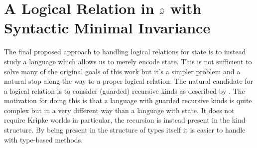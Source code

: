 \section{A Logical Relation in $\widehat{\omega}$ with Syntactic Minimal Invariance}\label{sec:guarded}

The final proposed approach to handling logical relations for state is
to instead study a language which allows us to merely encode
state. This is not sufficient to solve many of the original goals of
this work but it's a simpler problem and a natural stop along the way
to a proper logical relation. The natural candidate for a logical
relation is to consider (guarded) recursive kinds as described by
\citet{Pottier:11}. The motivation for doing this is that a language
with guarded recursive kinds is quite complex but in a very different
way than a language with state. It does not require Kripke worlds in
particular, the recursion is instead present in the kind structure. By
being present in the structure of types itself it is easier to handle
with type-based methods.

